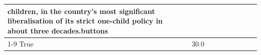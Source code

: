 \begin{table}[H]
\begin{tabular}{lllrlllll}
children, in the country's most significant liberalisation of its strict one-child policy in about three decades.buttons \\
\cline{1-9}
True & 30.0%
\end{tabular}
\end{table}

